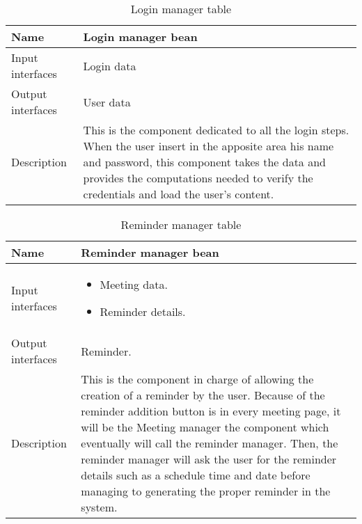 \begin{flushleft}
	
	\begin{table}[htp]
		
		\begin{tabular}{l|p{7cm}}
			
		
		
			Name&\textbf{Login manager bean}\\
			\hline
			\hline
			Input interfaces& Login data \\
			\hline
			Output interfaces& User data \\
			\hline
			Description&This is the component dedicated to all the login steps. When the user insert in the apposite area his name and password, this component takes the data and provides the computations needed to verify the credentials and load the user's content. \\
			\hline
			
		\end{tabular}
		
		\caption{Login manager table } 
		\label{tab:loginmanagertable}
		
	\end{table}
	
\end{flushleft}

\begin{flushleft}
	
	\begin{table}[htp]
		
		\begin{tabular}{l|p{7cm}}
		
			Name&\textbf{Reminder manager bean}\\
			\hline
			\hline
			Input interfaces& \begin{itemize} 
				\item Meeting data.
				\item Reminder details.
			\end{itemize} 
			\\
			\hline
			Output interfaces& Reminder. \\
			\hline
			Description&This is the component in charge of allowing the creation of a reminder by the user. Because of the reminder addition button is in every meeting page, it will be the Meeting manager the component which eventually will call the reminder manager. Then, the reminder manager will ask the user for the reminder details such as a schedule time and date before managing to generating the proper reminder in the system. \\
			\hline
			
		\end{tabular}
		
		\caption{Reminder manager table } 
		\label{tab:remindermanagertable}
		
	\end{table}
	
\end{flushleft}

